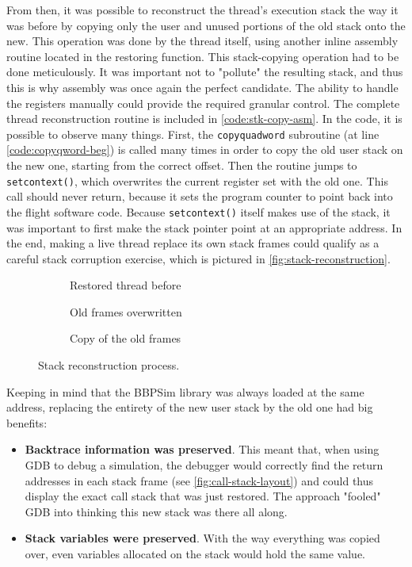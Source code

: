 From then, it was possible to reconstruct the thread's execution stack the way it was before by copying only the user and unused portions of the old stack onto the new. This operation was done by the thread itself, using another inline assembly routine located in the restoring function. This stack-copying operation had to be done meticulously. It was important not to "pollute" the resulting stack, and thus this is why assembly was once again the perfect candidate. The ability to handle the registers manually could provide the required granular control. The complete thread reconstruction routine is included in \autoref{code:stk-copy-asm}. In the code, it is possible to observe many things. First, the \texttt{copyquadword} subroutine (at line \ref{code:copyqword-beg}) is called many times in order to copy the old user stack on the new one, starting from the correct offset. Then the routine jumps to \texttt{setcontext()}, which overwrites the current register set with the old one. This call should never return, because it sets the program counter to point back into the flight software code. Because \texttt{setcontext()} itself makes use of the stack\cite{online:setcontext}, it was important to first make the stack pointer point at an appropriate address. In the end, making a live thread replace its own stack frames could qualify as a careful stack corruption exercise, which is pictured in \autoref{fig:stack-reconstruction}.

\begin{figure}[htbp]
	\centering
	\begin{subfigure}{.33\linewidth}
		\centering\small
		
		\caption{Restored thread before}
	\end{subfigure}%
	\begin{subfigure}{.33\linewidth}
		\centering\small
		
		\caption{Old frames overwritten}
	\end{subfigure}%
	\begin{subfigure}{.33\linewidth}
		\centering\small
		
		\caption{Copy of the old frames}
	\end{subfigure}
	\caption{Stack reconstruction process.}
	\label{fig:stack-reconstruction}
\end{figure}

Keeping in mind that the \gls{BBPSim} library was always loaded at the same address, replacing the entirety of the new user stack by the old one had big benefits:
\begin{itemize}
	\item \textbf{Backtrace information was preserved}. This meant that, when using GDB to debug a simulation, the debugger would correctly find the return addresses in each stack frame (see \autoref{fig:call-stack-layout}) and could thus display the exact call stack that was just restored. The approach "fooled" GDB into thinking this new stack was there all along.
	\item \textbf{Stack variables were preserved}. With the way everything was copied over, even variables allocated on the stack would hold the same value.
\end{itemize}

